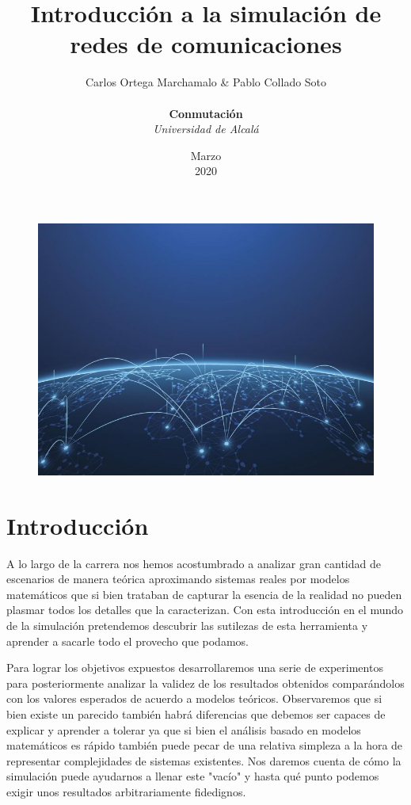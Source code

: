 \documentclass{article}[10pt]
\title{\textbf{Introducción a la simulación de redes de comunicaciones}}
\author{Carlos Ortega Marchamalo \& Pablo Collado Soto \\ \\ \textbf{Conmutación} \\ \textit{Universidad de Alcalá}}
\date{Marzo \\ 2020}
\begin{document}
	\begin{titlingpage}
		\maketitle
		\begin{figure}[!htb]
			\centering
			\includegraphics[width=1\linewidth]{Title_image.jpg}
		\end{figure}
	\end{titlingpage}

	\tableofcontents
	\newpage

	\section{Introducción}
		A lo largo de la carrera nos hemos acostumbrado a analizar gran cantidad de escenarios de manera teórica aproximando sistemas reales por modelos matemáticos que si bien trataban de capturar la esencia de la realidad no pueden plasmar todos los detalles que la caracterizan. Con esta introducción en el mundo de la simulación pretendemos descubrir las sutilezas de esta herramienta y aprender a sacarle todo el provecho que podamos.

		Para lograr los objetivos expuestos desarrollaremos una serie de experimentos para posteriormente analizar la validez de los resultados obtenidos comparándolos con los valores esperados de acuerdo a modelos teóricos. Observaremos que si bien existe un parecido también habrá diferencias que debemos ser capaces de explicar y aprender a tolerar ya que si bien el análisis basado en modelos matemáticos es rápido también puede pecar de una relativa simpleza a la hora de representar complejidades de sistemas existentes. Nos daremos cuenta de cómo la simulación puede ayudarnos a llenar este "vacío" y hasta qué punto podemos exigir unos resultados arbitrariamente fidedignos.
\end{document}
